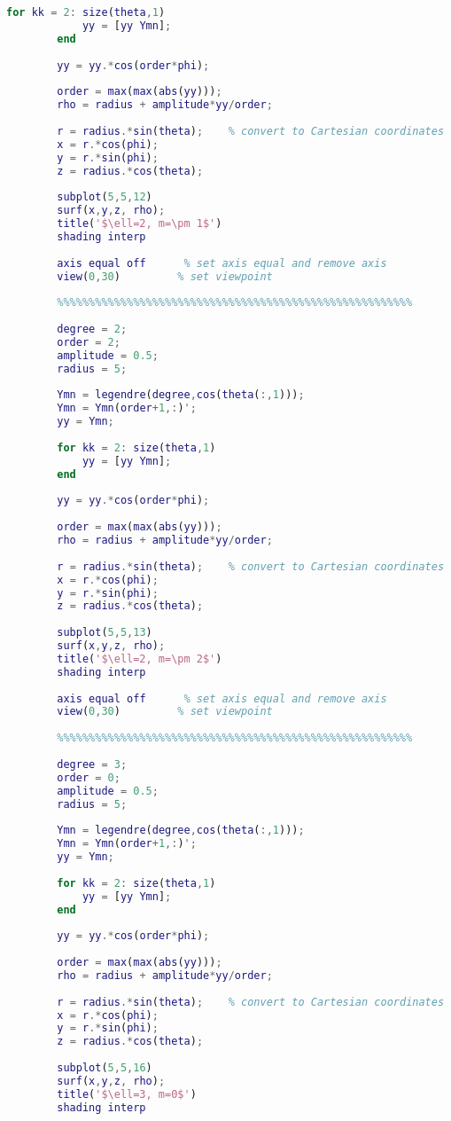 \begin{lstlisting}[language=MATLAB]
		for kk = 2: size(theta,1)
		    yy = [yy Ymn];
		end
		
		yy = yy.*cos(order*phi);
		
		order = max(max(abs(yy)));
		rho = radius + amplitude*yy/order;
		
		r = radius.*sin(theta);    % convert to Cartesian coordinates
		x = r.*cos(phi);
		y = r.*sin(phi);
		z = radius.*cos(theta);
		
		subplot(5,5,12)
		surf(x,y,z, rho);
		title('$\ell=2, m=\pm 1$')
		shading interp
		
		axis equal off      % set axis equal and remove axis
		view(0,30)         % set viewpoint
		
		%%%%%%%%%%%%%%%%%%%%%%%%%%%%%%%%%%%%%%%%%%%%%%%%%%%%%%%%
		
		degree = 2;
		order = 2;
		amplitude = 0.5;
		radius = 5;
		
		Ymn = legendre(degree,cos(theta(:,1)));
		Ymn = Ymn(order+1,:)';
		yy = Ymn;
		
		for kk = 2: size(theta,1)
		    yy = [yy Ymn];
		end
		
		yy = yy.*cos(order*phi);
		
		order = max(max(abs(yy)));
		rho = radius + amplitude*yy/order;
		
		r = radius.*sin(theta);    % convert to Cartesian coordinates
		x = r.*cos(phi);
		y = r.*sin(phi);
		z = radius.*cos(theta);
		
		subplot(5,5,13)
		surf(x,y,z, rho);
		title('$\ell=2, m=\pm 2$')
		shading interp
		
		axis equal off      % set axis equal and remove axis
		view(0,30)         % set viewpoint
		
		%%%%%%%%%%%%%%%%%%%%%%%%%%%%%%%%%%%%%%%%%%%%%%%%%%%%%%%%
		
		degree = 3;
		order = 0;
		amplitude = 0.5;
		radius = 5;
		
		Ymn = legendre(degree,cos(theta(:,1)));
		Ymn = Ymn(order+1,:)';
		yy = Ymn;
		
		for kk = 2: size(theta,1)
		    yy = [yy Ymn];
		end
		
		yy = yy.*cos(order*phi);
		
		order = max(max(abs(yy)));
		rho = radius + amplitude*yy/order;
		
		r = radius.*sin(theta);    % convert to Cartesian coordinates
		x = r.*cos(phi);
		y = r.*sin(phi);
		z = radius.*cos(theta);
		
		subplot(5,5,16)
		surf(x,y,z, rho);
		title('$\ell=3, m=0$')
		shading interp
		

\end{lstlisting}
